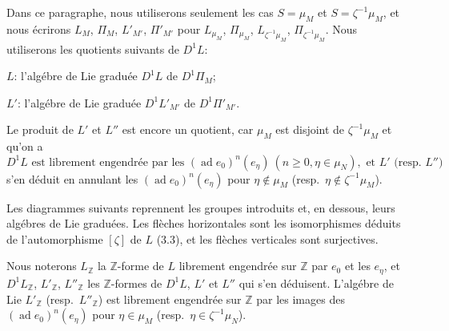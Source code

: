 \documentclass[11pt,a4paper]{article}
\theoremstyle{plain}
\theoremstyle{definition}
\DeclareMathOperator{\ad}{ad}
\newcommand{\Z}{\mathbb{Z}}
\begin{document}
Dans ce paragraphe, nous utiliserons seulement les cas $S = \mu_M$ et $S = \zeta^{-1} \mu_M$, et nous \'ecrirons $L_M$, $\Pi_M$, $L'_{M'}$, $\Pi'_{M'}$ pour $L_{\mu_M}$, $\Pi_{\mu_M}$, $L_{\zeta^{-1}\mu_M}$, $\Pi_{\zeta^{-1}\mu_M}$. Nous utiliserons les quotients suivants de $D^1L$:

$L$: l'alg\'ebre de Lie gradu\'ee $D^1L$ de $D^1\Pi_M$;

$L'$: l'alg\'ebre de Lie gradu\'ee $D^1L'_{M'}$ de $D^1\Pi'_{M'}$.

Le produit de $L'$ et $L''$ est encore un quotient, car $\mu_M$ est disjoint de $\zeta^{-1}\mu_M$ et qu'on a
\begin{equation}\label{eq:4.1.1}
D^1L \text{ est librement engendr\'ee par les } (\ad e_0)^n(e_\eta) \ (n \geq 0, \eta \in \mu_N), \text{ et } L' \text{ (resp.~}L''\text{)}
\end{equation}
s'en d\'eduit en annulant les $(\ad e_0)^n(e_\eta)$ pour $\eta \notin \mu_M$ (resp.~$\eta \notin \zeta^{-1}\mu_M$).

Les diagrammes suivants reprennent les groupes introduits et, en dessous, leurs alg\'ebres de Lie gradu\'ees. Les fl\`eches horizontales sont les isomorphismes d\'eduits de l'automorphisme $[\zeta]$ de $L$ (3.3), et les fl\`eches verticales sont surjectives.

\begin{center}
\end{center}

\begin{center}
\end{center}

Nous noterons $L_\Z$ la $\Z$-forme de $L$ librement engendr\'ee sur $\Z$ par $e_0$ et les $e_\eta$, et $D^1L_\Z$, $L'_\Z$, $L''_\Z$ les $\Z$-formes de $D^1L$, $L'$ et $L''$ qui s'en d\'eduisent. L'alg\'ebre de Lie $L'_\Z$ (resp.~$L''_\Z$) est librement engendr\'ee sur $\Z$ par les images des $(\ad e_0)^n(e_\eta)$ pour $\eta \in \mu_M$ (resp.~$\eta \in \zeta^{-1}\mu_N$).
\end{document}
